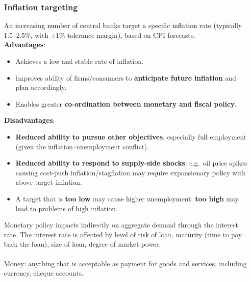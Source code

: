 \documentclass[a4paper,12pt]{article}
\begin{document}
\subsubsection*{Inflation targeting}
An increasing number of central banks target a specific inflation rate (typically 1.5--2.5\%, with $\pm$1\% tolerance margin), based on CPI forecasts.\\
\textbf{Advantages}:
\begin{itemize}
  \item Achieves a low and stable rate of inflation.
  \item Improves ability of firms/consumers to \textbf{anticipate future inflation} and plan accordingly.
  \item Enables greater \textbf{co-ordination between monetary and fiscal policy}.
\end{itemize}
\textbf{Disadvantages}:
\begin{itemize}
  \item \textbf{Reduced ability to pursue other objectives}, especially full employment (given the inflation--unemployment conflict).
  \item \textbf{Reduced ability to respond to supply-side shocks}: e.g.\ oil price spikes causing cost-push inflation/stagflation may require expansionary policy with above-target inflation.
  \item A target that is \textbf{too low} may cause higher unemployment; \textbf{too high} may lead to problems of high inflation.
\end{itemize}
Monetary policy impacts indirectly on aggregate demand through the interest rate. The interest rate is affected by level of risk of loan, maturity (time to pay back the loan), size of loan, degree of market power.\\\\
Money: anything that is acceptable as payment for goods and services, including currency, cheque accounts.
\end{document}
